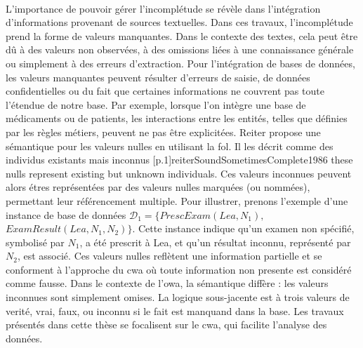 \paragraph{}
L'importance de pouvoir gérer l'incomplétude se révèle dans l'intégration d'informations provenant de sources textuelles.
Dans ces travaux, l'incomplétude prend la forme de valeurs manquantes.
Dans le contexte des textes, cela peut être dû à des valeurs non observées, à des omissions liées à une connaissance générale ou simplement à des erreurs d'extraction.
Pour l'intégration de bases de données, les valeurs manquantes peuvent résulter d'erreurs de saisie, de données confidentielles ou du fait que certaines informations ne couvrent pas toute l'étendue de notre base.
Par exemple, lorsque l'on intègre une base de médicaments ou de patients, les interactions entre les entités, telles que définies par les règles métiers, peuvent ne pas être explicitées.
Reiter propose une sémantique pour les valeurs nulles en utilisant la \gls{fol}.
Il les décrit comme des individus existants mais inconnus [p.1]{reiterSoundSometimesComplete1986}{\label{reiterSemantic}\textelp{} these nulls represent existing but unknown individuals}.
Ces valeurs inconnues peuvent alors étres représentées par des valeurs nulles marquées (ou nommées), permettant leur référencement multiple.
Pour illustrer, prenons l'exemple d'une instance de base de données $\mathcal{D}_1= \{PrescExam(Lea, N_1),$ $ExamResult(Lea, N_1, N_2)\}$.
Cette instance indique qu'un examen non spécifié, symbolisé par $N_1$, a été prescrit à Lea, et qu'un résultat inconnu, représenté par $N_2$, est associé.
Ces valeurs nulles reflètent une information partielle et se conforment à l'approche du \gls{cwa} où toute information non presente est considéré comme fausse.
Dans le contexte de l'\gls{owa}, la sémantique diffère : les valeurs inconnues sont simplement omises. %
La logique sous-jacente est à trois valeurs de verité, vrai, faux, ou inconnu si le fait est manquand dans la base.
Les travaux présentés dans cette thèse se focalisent sur le \gls{cwa}, qui facilite l'analyse des données. %

